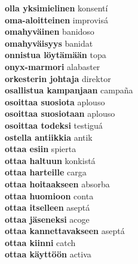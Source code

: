 \textbf{ olla yksimielinen  } konsentí \\
\textbf{ oma-aloitteinen  } improvisá \\
\textbf{ omahyväinen  } banidoso \\
\textbf{ omahyväisyys  } banidat \\
\textbf{ onnistua löytämään  } topa \\
\textbf{ onyx-marmori  } alabaster \\
\textbf{ orkesterin johtaja  } direktor \\
\textbf{ osallistua kampanjaan  } campaña \\
\textbf{ osoittaa suosiota  } aplouso \\
\textbf{ osoittaa suosiotaan  } aplouso \\
\textbf{ osoittaa todeksi  } testiguá \\
\textbf{ ostella antiikkia  } antik \\
\textbf{ ottaa esiin  } spierta \\
\textbf{ ottaa haltuun  } konkistá \\
\textbf{ ottaa harteille  } carga \\
\textbf{ ottaa hoitaakseen  } absorba \\
\textbf{ ottaa huomioon  } conta \\
\textbf{ ottaa itselleen  } aseptá \\
\textbf{ ottaa jäseneksi  } acoge \\
\textbf{ ottaa kannettavakseen  } aseptá \\
\textbf{ ottaa kiinni  } catch \\
\textbf{ ottaa käyttöön  } activa \\
